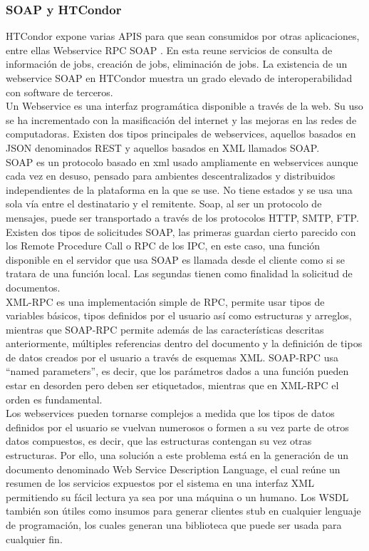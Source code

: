 \subsubsection{SOAP y HTCondor}

HTCondor expone varias APIS\cite{CondorAPI} para que sean consumidos por otras aplicaciones, entre ellas Webservice RPC SOAP \cite{SOAPBox:2000}. En esta reune servicios de consulta de información de jobs, creación de jobs, eliminación de jobs. La existencia de un webservice SOAP en HTCondor muestra un grado elevado de interoperabilidad con software de terceros. \\

Un Webservice es una interfaz programática disponible a través de la web. Su uso se ha incrementado con la masificación del internet y las mejoras en las redes de computadoras. Existen dos tipos principales de webservices, aquellos basados en JSON denominados REST y aquellos basados en XML llamados SOAP. \\

SOAP es un protocolo basado en xml usado ampliamente en webservices aunque cada vez en desuso, pensado para ambientes descentralizados y distribuidos independientes de la plataforma en la que se use. No tiene estados y se usa una sola vía entre el destinatario y el remitente. Soap, al ser un protocolo de mensajes, puede ser transportado a través de los protocolos HTTP, SMTP, FTP. Existen dos tipos de solicitudes SOAP, las primeras guardan cierto parecido con los Remote Procedure Call o RPC de los IPC, en este caso, una función disponible en el servidor que usa SOAP es llamada desde el cliente como si se tratara de una función local. Las segundas tienen como finalidad la solicitud de documentos. \\

XML-RPC es una implementación simple de RPC, permite usar tipos de variables básicos, tipos definidos por el usuario así como estructuras y arreglos, mientras que SOAP-RPC permite además de las características descritas anteriormente, múltiples referencias dentro del documento y la definición de tipos de datos creados por el usuario a través de esquemas XML. SOAP-RPC usa “named parameters”, es decir, que los parámetros dados a una función pueden estar en desorden pero deben ser etiquetados, mientras que en XML-RPC el orden es fundamental.\\

Los webservices pueden tornarse complejos a medida que los tipos de datos definidos por el usuario se vuelvan numerosos o formen a su vez parte de otros datos compuestos, es decir, que las estructuras contengan su vez otras estructuras. Por ello, una solución a este problema está en la generación de un documento denominado Web Service Description Language, el cual reúne un resumen de los servicios expuestos por el sistema en una interfaz XML permitiendo su fácil lectura ya sea por una máquina o un humano. Los WSDL también son útiles como insumos para generar clientes stub en cualquier lenguaje de programación, los cuales generan una biblioteca que puede ser usada para cualquier fin.\\

